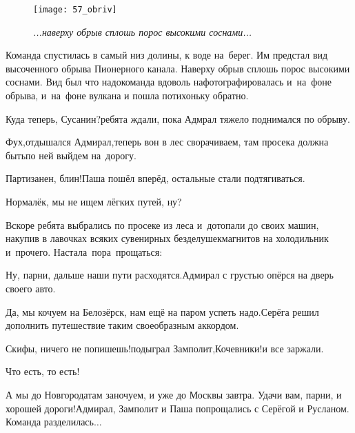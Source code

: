 \begin{figure}[h]
	\centering
	\texttt{[image: 57\_obriv]}
	\caption{\small\textit{...наверху обрыв сплошь порос высокими соснами...}}
\end{figure}

Команда спустилась в самый низ долины, к воде на~берег. Им предстал вид высоченного обрыва Пионерного канала. Наверху обрыв сплошь порос высокими соснами. Вид был что надо\mdash команда вдоволь нафотографировалась и~на~фоне обрыва, и~на~фоне вулкана и пошла потихоньку обратно.

\diagdash Куда теперь, Сусанин?\mdash ребята ждали, пока Адмрал тяжело поднимался по обрыву.

\diagdash Фух,\mdash отдышался Адмирал,\mdash теперь вон в лес сворачиваем, там просека должна быть\mdash по ней выйдем на~дорогу.

\diagdash Партизанен, блин!\mdash Паша пошёл вперёд, остальные стали подтягиваться.

\diagdash Нормалёк, мы не ищем лёгких путей, ну?


Вскоре ребята выбрались по просеке из леса и~дотопали до своих машин, накупив в лавочках всяких сувенирных безделушек\mdash магнитов на холодильник и~прочего. Настала~пора~прощаться:

\diagdash Ну, парни, дальше наши пути расходятся.\mdash Адмирал с грустью опёрся на дверь своего авто.

\diagdash Да, мы кочуем на Белозёрск, нам ещё на паром успеть надо.\mdash Серёга решил дополнить путешествие таким своеобразным аккордом.

\diagdash Скифы, ничего не попишешь!\mdash подыграл Замполит,\mdash Кочевники!\mdash и все заржали.

\diagdash Что есть, то есть! 

\diagdash А мы до Новгорода\mdash там заночуем, и уже до Москвы завтра. Удачи вам, парни, и хорошей дороги!\mdash Адмирал, Замполит и Паша попрощались с Серёгой и Русланом. Команда разделилась$\ldots$

